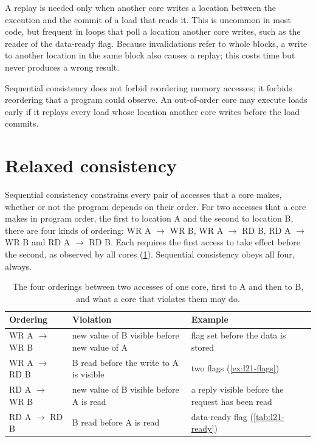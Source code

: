 \documentclass[../main.tex]{subfiles}
\begin{document}
A replay is needed only when another core writes a location between the
execution and the commit of a load that reads it.  This is uncommon in most
code, but frequent in loops that poll a location another core writes, such as
the reader of the data-ready flag.  Because invalidations refer to whole
blocks, a write to another location in the same block also causes a replay;
this costs time but never produces a wrong result.

\begin{keypoint}
  Sequential consistency does not forbid reordering memory accesses; it
  forbids reordering that a program could observe.  An out-of-order core may
  execute loads early if it replays every load whose location another core
  writes before the load commits.
\end{keypoint}

\section{Relaxed consistency}
\label{sec:l21-relaxed}

Sequential consistency constrains every pair of accesses that a core makes,
whether or not the program depends on their order.  For two accesses that a core makes in program order, the
first to location A and the second to location B, there are four kinds of
ordering: WR A $\to$ WR B, WR A $\to$ RD B, RD A $\to$ WR B and RD A $\to$ RD
B.  Each requires the first access to take effect before the second, as
observed by all cores (\cref{tab:l21-orderings}).  Sequential consistency
obeys all four, always.

\begin{table}[htbp]
  \centering\small
  \caption{The four orderings between two accesses of one core, first to A and
    then to B, and what a core that violates them may do.}
  \label{tab:l21-orderings}
  \begin{tabular}{@{}lp{4.3cm}p{4.1cm}@{}}
    \toprule
    Ordering & Violation & Example \\
    \midrule
    WR A $\to$ WR B & new value of B visible before new value of A
      & flag set before the data is stored \\
    WR A $\to$ RD B & B read before the write to A is visible
      & two flags (\cref{ex:l21-flags}) \\
    RD A $\to$ WR B & new value of B visible before A is read
      & a reply visible before the request has been read \\
    RD A $\to$ RD B & B read before A is read
      & data-ready flag (\cref{tab:l21-ready}) \\
    \bottomrule
  \end{tabular}
\end{table}
\end{document}
